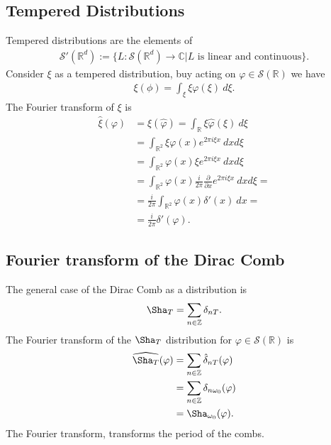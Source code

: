 \documentclass[a4paper]{article}
\begin{document}
\subsection{Tempered Distributions}
Tempered distributions are the elements of
\begin{align}
    \mathcal{S}'(\mathbb{R}^d) :=
    \bigg\{
        L: \mathcal{S}(\mathbb{R}^d) \rightarrow \mathbb{C} | \text{$L$ is
        linear and continuous}
    \bigg\}.
\end{align}
Consider $\xi$ as a tempered distribution, buy acting on $\varphi \in
\mathcal{S}(\mathbb{R})$ we have
\begin{align}
    \xi(\phi) = \int_\xi \xi \varphi(\xi)\ d\xi.
\end{align}
The Fourier transform of $\xi$ is
\begin{align}
    \hat{\xi}(\varphi)
    &=\xi(\hat{\varphi})
    = \int_\mathbb{R} \xi \hat{\varphi}(\xi)\ d\xi\\
    &= \int_{\mathbb{R}^2}\xi \varphi(x) e^{2\pi i\xi x}\ dxd\xi\\
    &= \int_{\mathbb{R}^2}\varphi(x) \xi e^{2\pi i \xi x}\ dxd\xi\\
    &=\int_{\mathbb{R}^2}\varphi(x)\frac{i}{2\pi} \frac{\partial}{\partial x}
     e^{2\pi i \xi x}\ dxd\xi =\\
    &=\frac{i}{2\pi}\int_{\mathbb{R}^2}\varphi(x)\delta'(x)\ dx=\\
    &=\frac{i}{2\pi} \delta'(\varphi).
\end{align}
\subsection{Fourier transform of the Dirac Comb}
The general case of the Dirac Comb as a distribution is
\begin{align}
    \Sha_T = \sum_{n \in \mathbb{Z}} \delta_{nT}.
\end{align}
The Fourier transform of the $\Sha_T$ distribution for $\varphi \in
\mathcal{S}(\mathbb{R})$ is
\begin{align}
    \widehat{\Sha_T}(\varphi)
    &= \sum_{n\in\mathbb{Z}} \hat{\delta}_{nT}(\varphi)\\
    &= \sum_{n\in\mathbb{Z}} \delta_{n\omega_0}(\varphi)\\
    &=\Sha_{\omega_0}(\varphi).
\end{align}
The Fourier transform, transforms the period of the combs.
\end{document}
